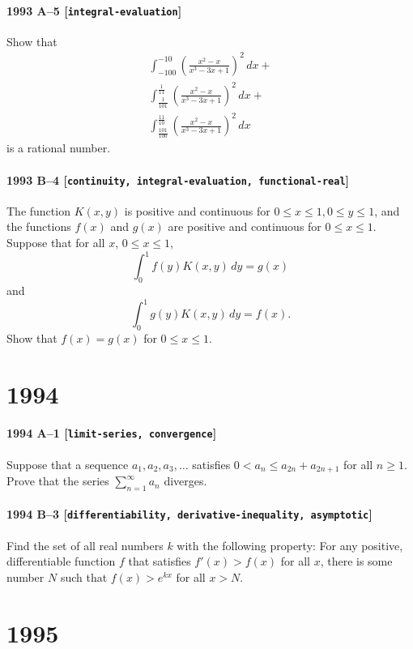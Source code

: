 \documentclass[11pt]{article}
\begin{document}
\paragraph{1993 A--5 \textnormal{[\texttt{integral-evaluation}]}}
Show that
\begin{gather*}
\int_{-100}^{-10} \left( \frac{x^2 - x}{x^3 - 3x + 1} \right)^2\,dx + \\
\int_{\frac{1}{101}}^{\frac{1}{11}} \left( \frac{x^2 - x}{x^3 - 3x + 1} \right)^2\,dx + \\
\int_{\frac{101}{100}}^{\frac{11}{10}} \left( \frac{x^2 - x}{x^3 - 3x + 1} \right)^2\,dx
\end{gather*}
is a rational number.

\paragraph{1993 B--4 \textnormal{[\texttt{continuity, integral-evaluation, functional-real}]}}
The function $K(x,y)$ is positive and continuous for $0 \leq x \leq 1, 0
\leq y \leq 1$, and the functions $f(x)$ and $g(x)$ are positive and
continuous for $0 \leq x \leq 1$. Suppose that for all $x$, $0 \leq x \leq 1$,
\[
\int_0^1 f(y)K(x,y)\,dy = g(x)
\]
and
\[
\int_0^1 g(y)K(x,y)\,dy = f(x).
\]
Show that $f(x) = g(x)$ for $0 \leq x \leq 1$.

\section*{1994}

\paragraph{1994 A--1 \textnormal{[\texttt{limit-series, convergence}]}}
Suppose that a sequence $a_1, a_2, a_3, \dots$ satisfies
$0 < a_n \leq a_{2n} + a_{2n+1}$ for all $n \geq 1$. Prove that the series
$\sum_{n=1}^{\infty} a_n$ diverges.

\paragraph{1994 B--3 \textnormal{[\texttt{differentiability, derivative-inequality, asymptotic}]}}
Find the set of all real numbers $k$ with the following property: For any
positive, differentiable function $f$ that satisfies $f'(x) > f(x)$
for all $x$, there is some number $N$ such that
$f(x) > e^{kx}$ for all $x > N$.

\section*{1995}
\end{document}
